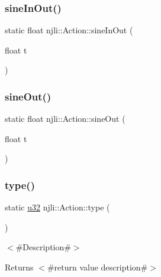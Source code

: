 \subsubsection{\texorpdfstring{sine\+In\+Out()}{sineInOut()}}
{\footnotesize\ttfamily static float njli\+::\+Action\+::sine\+In\+Out (\begin{DoxyParamCaption}\item[{float}]{t }\end{DoxyParamCaption})\hspace{0.3cm}{\ttfamily [static]}}

\mbox{\label{classnjli_1_1_action_a6c6b65d55075ec64e5fb1f55d9d61686}} 
\subsubsection{\texorpdfstring{sine\+Out()}{sineOut()}}
{\footnotesize\ttfamily static float njli\+::\+Action\+::sine\+Out (\begin{DoxyParamCaption}\item[{float}]{t }\end{DoxyParamCaption})\hspace{0.3cm}{\ttfamily [static]}}

\mbox{\label{classnjli_1_1_action_a02d99cc47d811640803da7d9fd000d84}} 
\subsubsection{\texorpdfstring{type()}{type()}}
{\footnotesize\ttfamily static \mbox{\hyperlink{_util_8h_a10e94b422ef0c20dcdec20d31a1f5049}{u32}} njli\+::\+Action\+::type (\begin{DoxyParamCaption}{ }\end{DoxyParamCaption})\hspace{0.3cm}{\ttfamily [static]}}

$<$\#\+Description\#$>$

\begin{DoxyReturn}{Returns}
$<$\#return value description\#$>$ 
\end{DoxyReturn}
\mbox{\label{classnjli_1_1_action_aa1e2033b0f03fa1dce4c39fa707b84fe}} 
